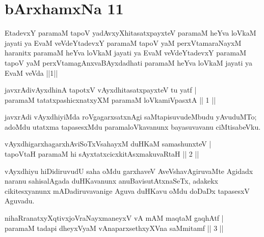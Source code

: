 \centerline{}

\section*{bArxhamxNa 11}

\begin{shl}
EtadevxY paramaM tapoV yadAvxyXhitasatxpayxteV paramaM heYva loVkaM jayati ya EvaM veVdeYtadevxY paramaM tapoV yaM perxVtamaraNayxM haranitx paramaM heYva loVkaM jayati ya EvaM veVdeYtadevxY paramaM tapoV yaM perxVtamagAnxvaBAyxdadhati paramaM heYva loVkaM jayati ya EvaM veVda ||1||
\end{shl}



\begin{shl}
javxrAdivAyxdhinA tapotxV vAyxdhitasatxpayxteV tu yatf | \\
paramaM tatatxpashicxnatxyXM paramaM loVkamiVpasxtA \hfill ||  1 ||
\end{shl}

\begin{artha}
javxrAdi vAyxdhiyiMda roVgagarxsatxnAgi saMtapisuvudeMbudu yAvuduMTo; adoMdu utatxma tapasesxMdu paramaloVkavanunx bayasuvavanu ciMtisabeVku.
\end{artha}


\begin{shl}
vAyxdhigarxhagarxhAviSoTxV\s sahayxM duHKaM samashunxteV | \\
tapoV\s taH paramaM hi sAyxtatxcicxkitAsxmakuvaRtaH \hfill ||  2 || 
\end{shl}

\begin{artha}
vAyxdhiyu hiDidiruvudU saha oMdu garxhaveV AveVshavAgiruvaMte Agidadx naranu sahisalAgada duHKavanunx anuBavisutAtxnaSeTx, adakekx cikitesxyanunx mADadiruvavanige Aguva duHKavu oMdu doDaDx tapasesxV Aguvadu.
\end{artha}


\begin{shl}
nihaRranatxyXqtivxjoV\s raNayxmaneyxV vA mAM maqtaM gaqhAtf | \\
paramaM tadapi dheyxVyaM vAnaparxsethxyXVna saMmitamf \hfill ||  3 || 
\end{shl}

